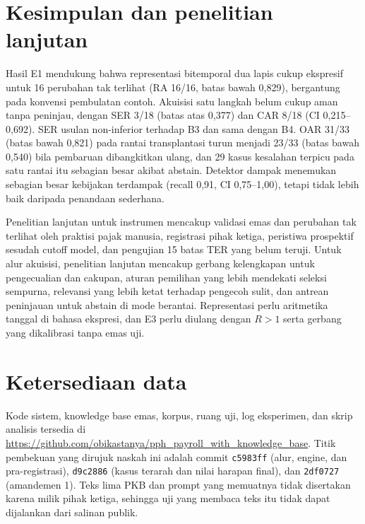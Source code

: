 \documentclass[conference]{IEEEtran}
\makeatletter
\DeclareRobustCommand{\en}[1]{{\usefont{\f@encoding}{\f@family}{\f@series}{it}#1\/}}
\makeatother
\begin{document}
\section{Kesimpulan dan penelitian lanjutan}
\label{sec:kesimpulan}
Hasil E1 mendukung bahwa representasi bitemporal dua lapis cukup ekspresif untuk 16 perubahan tak terlihat (RA 16/16, batas bawah 0,829), bergantung pada konvensi pembulatan contoh. Akuisisi satu langkah belum cukup aman tanpa peninjau, dengan SER 3/18 (batas atas 0,377) dan CAR 8/18 (CI 0,215--0,692). SER usulan non-inferior terhadap B3 dan sama dengan B4. OAR 31/33 (batas bawah 0,821) pada rantai transplantasi turun menjadi 23/33 (batas bawah 0,540) bila pembaruan dibangkitkan ulang, dan 29 kasus kesalahan terpicu pada satu rantai itu sebagian besar akibat \en{abstain}. Detektor dampak menemukan sebagian besar kebijakan terdampak (\en{recall} 0,91, CI 0,75--1,00), tetapi tidak lebih baik daripada penandaan sederhana.

Penelitian lanjutan untuk instrumen mencakup validasi emas dan perubahan tak terlihat oleh praktisi pajak manusia, registrasi pihak ketiga, peristiwa prospektif sesudah \en{cutoff} model, dan pengujian 15 batas TER yang belum teruji. Untuk alur akuisisi, penelitian lanjutan mencakup gerbang kelengkapan untuk pengecualian dan cakupan, aturan pemilihan yang lebih mendekati seleksi sempurna, relevansi yang lebih ketat terhadap pengecoh sulit, dan antrean peninjauan untuk \en{abstain} di mode berantai. Representasi perlu aritmetika tanggal di bahasa ekspresi, dan E3 perlu diulang dengan $R > 1$ serta gerbang yang dikalibrasi tanpa emas uji.

\section*{Ketersediaan data}
Kode sistem, \en{knowledge base} emas, korpus, ruang uji, log eksperimen, dan skrip analisis tersedia di \url{https://github.com/obikastanya/pph_payroll_with_knowledge_base}. Titik pembekuan yang dirujuk naskah ini adalah \en{commit} \texttt{c5983ff} (alur, \en{engine}, dan pra-registrasi), \texttt{d9c2886} (kasus terarah dan nilai harapan final), dan \texttt{2df0727} (amandemen 1). Teks lima PKB dan \en{prompt} yang memuatnya tidak disertakan karena milik pihak ketiga, sehingga uji yang membaca teks itu tidak dapat dijalankan dari salinan publik.
\end{document}
